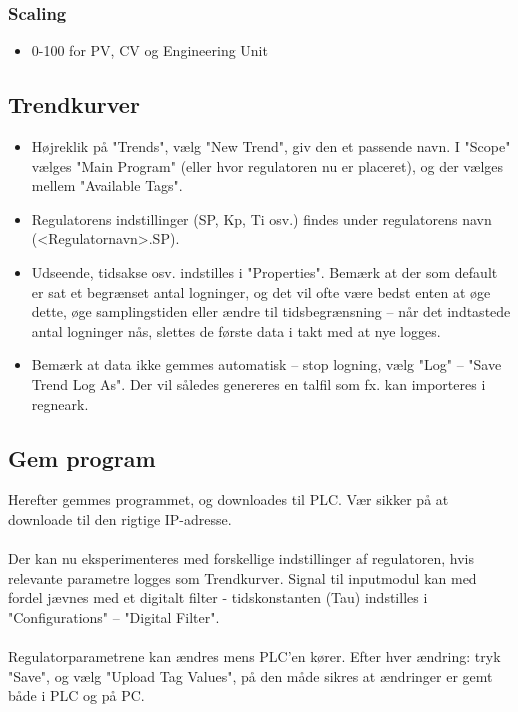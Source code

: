 \documentclass[12pt,a4paper]{article}
\begin{document}
	\subsubsection*{Scaling}
	\begin{itemize}
		\item 0-100 for PV, CV og Engineering Unit
	\end{itemize}
	
	\subsection*{Trendkurver}
	
	\begin{itemize}
		\item Højreklik på "Trends", vælg "New Trend", giv den et passende navn. I "Scope" vælges "Main Program" (eller hvor regulatoren nu er placeret), og der vælges mellem "Available Tags".
		\item Regulatorens indstillinger (SP, Kp, Ti osv.) findes under regulatorens navn (\textless{}Regulatornavn\textgreater{}.SP).
		\item Udseende, tidsakse osv. indstilles i "Properties". Bemærk at der som default er sat et begrænset antal logninger, og det vil ofte være bedst enten at øge dette, øge samplingstiden eller ændre til tidsbegrænsning – når det indtastede antal logninger nås, slettes de første data i takt med at nye logges.
		\item Bemærk at data ikke gemmes automatisk – stop logning, vælg "Log" – "Save Trend Log As". Der vil således genereres en talfil som fx. kan importeres i regneark.
	\end{itemize}
	
	\subsection*{Gem program}
	Herefter gemmes programmet, og downloades til PLC. Vær sikker på at downloade til den rigtige IP-adresse.
	\\\\
	Der kan nu eksperimenteres med forskellige indstillinger af regulatoren, hvis relevante parametre logges som Trendkurver. Signal til inputmodul kan med fordel jævnes med et digitalt filter - tidskonstanten (Tau) indstilles i "Configurations" – "Digital Filter".
	\\\\
	Regulatorparametrene kan ændres mens PLC’en kører. Efter hver ændring: tryk "Save", og vælg "Upload Tag Values", på den måde sikres at ændringer er gemt både i PLC og på PC.
	
\end{document}
